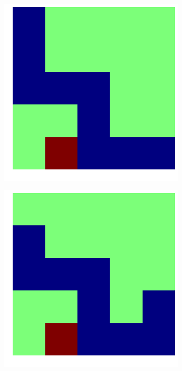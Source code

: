 \documentclass{article}
\begin{document}
\begin{figure}[!htpb]
\begin{subfigure}[b]{.19\linewidth}
  \end{subfigure}
  \begin{subfigure}[b]{.19\linewidth}
    \includegraphics[width=\linewidth]{snake_64.png}
  \end{subfigure}
  \begin{subfigure}[b]{.19\linewidth}
    \includegraphics[width=\linewidth]{snake_65.png}

\end{subfigure}
\end{figure}
\end{document}
